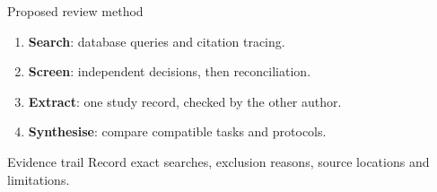 \begin{frame}{Proposed review method}
\begin{enumerate}
\item \textbf{Search}: database queries and citation tracing.
\item \textbf{Screen}: independent decisions, then reconciliation.
\item \textbf{Extract}: one study record, checked by the other author.
\item \textbf{Synthesise}: compare compatible tasks and protocols.
\end{enumerate}
\vspace{4mm}
\begin{block}{Evidence trail}
Record exact searches, exclusion reasons, source locations and limitations.
\end{block}
\end{frame}
